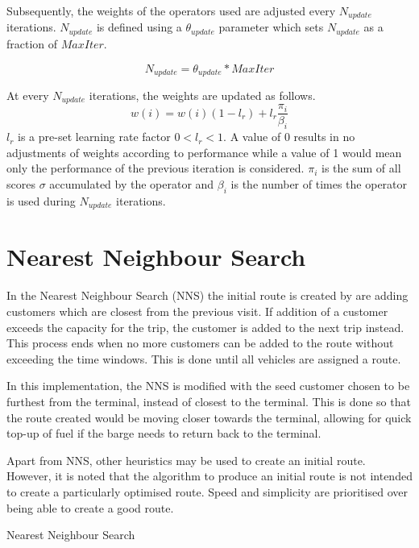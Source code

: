 Subsequently, the weights of the operators used are adjusted every $N_{update}$ iterations. $N_{update}$ is defined using a $\theta_{update}$ parameter which sets $N_{update}$ as a fraction of $MaxIter$.

\begin{equation}
N_{update} = \theta_{update} *MaxIter
\end{equation}

At every $N_{update}$ iterations, the weights are updated as follows.
\begin{equation} \label{eq:AA}
w (i) = w(i) (1-l_{r}) + l_{r} \frac{\pi_{i}}{\beta_{i}}
\end{equation}
$l_{r}$ is a pre-set learning rate factor $0<l_{r}<1$. A value of 0 results in no adjustments of weights according to performance while a value of 1 would mean only the performance of the previous iteration is considered. $\pi_{i}$ is the sum of all scores $\sigma$ accumulated by the operator and $\beta_{i}$ is the number of times the operator is used during $N_{update}$ iterations.

\section{Nearest Neighbour Search}
In the Nearest Neighbour Search (NNS) the initial route is created by are adding customers which are closest from the previous visit. If addition of a customer exceeds the capacity for the trip, the customer is added to the next trip instead. This process ends when no more customers can be added to the route without exceeding the time windows. This is done until all vehicles are assigned a route.

In this implementation, the NNS is modified with the seed customer chosen to be furthest from the terminal, instead of closest to the terminal. This is done so that the route created would be moving closer towards the terminal, allowing for quick top-up of fuel if the barge needs to return back to the terminal.

Apart from NNS, other heuristics may be used to create an initial route. However, it is noted that the algorithm to produce an initial route is not intended to create a particularly optimised route. Speed and simplicity are prioritised over being able to create a good route.

\begin{algorithm} \label{Algo 2}
\BlankLine


\caption{Nearest Neighbour Search}
\end{algorithm}


